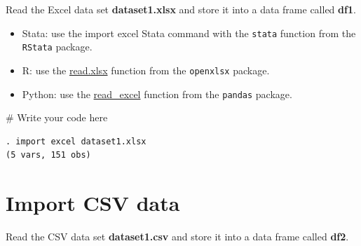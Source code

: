 \documentclass[
  letterpaper,
  DIV=11,
  numbers=noendperiod]{scrreprt}
\newenvironment{Shaded}{\begin{snugshade}}{\end{snugshade}}
\newcommand{\CommentTok}[1]{\textcolor[rgb]{0.37,0.37,0.37}{#1}}
\providecommand{\tightlist}{%
  \setlength{\itemsep}{0pt}\setlength{\parskip}{0pt}}\usepackage{longtable,booktabs,array}
\begin{document}
Read the Excel data set \textbf{dataset1.xlsx} and store it into a data
frame called \textbf{df1}.

\begin{tcolorbox}[enhanced jigsaw, left=2mm, colback=white, coltitle=black, toptitle=1mm, bottomrule=.15mm, rightrule=.15mm, leftrule=.75mm, bottomtitle=1mm, colbacktitle=quarto-callout-tip-color!10!white, opacityback=0, arc=.35mm, colframe=quarto-callout-tip-color-frame, titlerule=0mm, title=\textcolor{quarto-callout-tip-color}{\faLightbulb}\hspace{0.5em}{Tip}, breakable, toprule=.15mm, opacitybacktitle=0.6]

\begin{itemize}
\tightlist
\item
  Stata: use the import excel Stata command with the \texttt{stata}
  function from the \texttt{RStata} package.
\item
  R: use the
  \href{https://www.rdocumentation.org/packages/openxlsx/versions/4.2.5/topics/read.xlsx}{read.xlsx}
  function from the \texttt{openxlsx} package.
\item
  Python: use the
  \href{https://pandas.pydata.org/docs/reference/api/pandas.read_excel.html}{read\_excel}
  function from the \texttt{pandas} package.
\end{itemize}

\end{tcolorbox}

\begin{Shaded}
\begin{Highlighting}[]
\CommentTok{\# Write your code here}
\end{Highlighting}
\end{Shaded}

\begin{verbatim}
. import excel dataset1.xlsx
(5 vars, 151 obs)
\end{verbatim}

\hypertarget{import-csv-data}{%
\section{Import CSV data}\label{import-csv-data}}

Read the CSV data set \textbf{dataset1.csv} and store it into a data
frame called \textbf{df2}.
\end{document}
